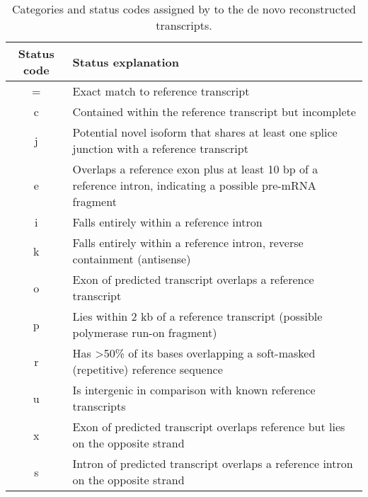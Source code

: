 \begin{table}[h!]
	\centering
	\begin{tabular}{cp{12cm}}
		\textbf{Status code} & \textbf{Status explanation} \\
		\hline
= &	 Exact match to reference transcript \\
c &		Contained within the reference transcript but incomplete \\
j &		 Potential novel isoform that shares at least one splice junction with a reference transcript \\
e &		Overlaps a reference exon plus at least 10 bp of a reference intron, indicating a possible pre-mRNA fragment \\
i &		 Falls entirely within a reference intron \\
k &	 Falls entirely within a reference intron, reverse containment (antisense) \\
o &		Exon of predicted transcript overlaps a reference transcript \\
p &		Lies within 2 kb of a reference transcript (possible polymerase run-on fragment) \\
r &		 Has >50\% of its bases overlapping a soft-masked (repetitive) reference sequence \\
u &		Is intergenic in comparison with known reference transcripts \\
x &		Exon of predicted transcript overlaps reference but lies on the opposite strand \\
s &		Intron of predicted transcript overlaps a reference intron on the opposite strand \\
		\hline
	\end{tabular}
	\caption{Categories and status codes assigned by  to the de novo reconstructed transcripts.}
	\label{tab:tinats:denovostatuscodes}
\end{table}

